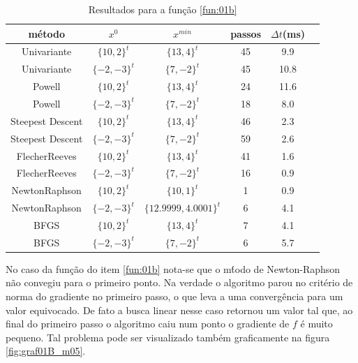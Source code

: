 \documentclass[10pt, a4paper]{article}
\begin{document}
\begin{table}[H]
      \small
      \centering
      \caption{Resultados para a fun\c c\~ao \ref{fun:01b}}
      \begin{tabular}{c|c|c|c|c|c}
            m\'etodo           & $x^0$ & $x^{min}$ & passos & $\Delta t$(ms) \\
            \hline
            Univariante         & $\{10,2\}^t$    & $\{13,4\}^t$  & 45 & 9.9 \\
            Univariante         & $\{-2,-3\}^t$   & $\{7,-2\}^t$  & 45 & 10.8 \\
            Powell              & $\{10,2\}^t$    & $\{13,4\}^t$  & 24 & 11.6 \\
            Powell              & $\{-2,-3\}^t$   & $\{7,-2\}^t$  & 18 & 8.0 \\
            Steepest Descent    & $\{10,2\}^t$    & $\{13,4\}^t$  & 46 & 2.3 \\
            Steepest Descent    & $\{-2,-3\}^t$   & $\{7,-2\}^t$  & 59 & 2.6 \\
            Flecher\-Reeves     & $\{10,2\}^t$    & $\{13,4\}^t$  & 41 & 1.6 \\
            Flecher\-Reeves     & $\{-2,-3\}^t$   & $\{7,-2\}^t$  & 16 & 0.9 \\
            Newton\-Raphson     & $\{10,2\}^t$    & $\{10,1\}^t$  &  1 & 0.9 \\
            Newton\-Raphson     & $\{-2,-3\}^t$   & $\{12.9999,4.0001\}^t$  &  6 & 4.1 \\
            BFGS                & $\{10,2\}^t$    & $\{13,4\}^t$  &  7 & 4.1 \\
            BFGS                & $\{-2,-3\}^t$   & $\{7,-2\}^t$  &  6 & 5.7 \\
     \end{tabular}
      \label{table:resultadosf1b}
\end{table}

No caso da fun\c c\~ao do item \ref{fun:01b} nota-se que o m\'todo de Newton-Raphson n\~ao convegiu para o primeiro ponto. Na verdade o algoritmo parou no crit\'erio de norma do gradiente no primeiro passo, o que leva a uma converg\^encia para um valor equivocado. De fato a busca linear nesse caso retornou um valor tal que, ao final do primeiro passo o algoritmo caiu num ponto o gradiente de $f$ \'e muito pequeno. Tal problema pode ser visualizado tamb\'em graficamente na figura \ref{fig:graf01B_m05}.
\end{document}
